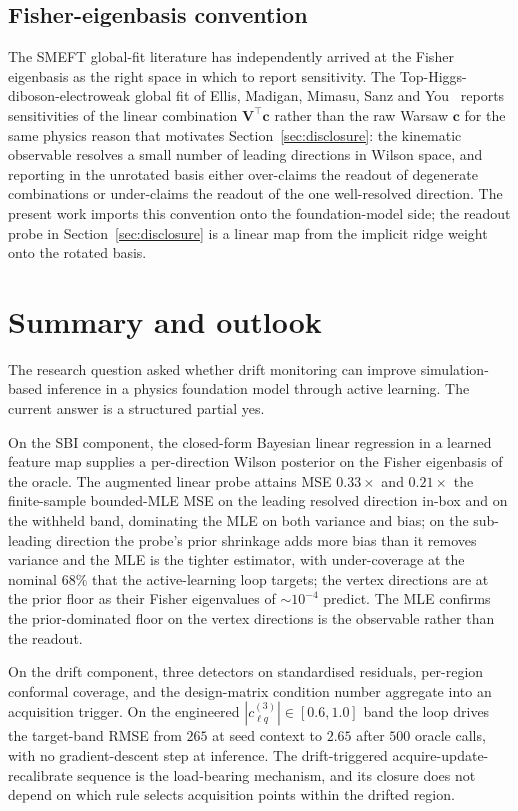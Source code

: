 \documentclass[11pt,a4paper]{article}
\begin{document}
\subsection{Fisher-eigenbasis convention}

The SMEFT global-fit literature has independently arrived at the Fisher eigenbasis as the right space in which to report sensitivity. The Top-Higgs-diboson-electroweak global fit of Ellis, Madigan, Mimasu, Sanz and You~\cite{Ellis:2020smeft} reports sensitivities of the linear combination $\bm{V}^\top \bm{c}$ rather than the raw Warsaw $\bm{c}$ for the same physics reason that motivates Section~\ref{sec:disclosure}: the kinematic observable resolves a small number of leading directions in Wilson space, and reporting in the unrotated basis either over-claims the readout of degenerate combinations or under-claims the readout of the one well-resolved direction. The present work imports this convention onto the foundation-model side; the readout probe in Section~\ref{sec:disclosure} is a linear map from the implicit ridge weight onto the rotated basis.

\section{Summary and outlook}
\label{sec:conclusions}

The research question asked whether drift monitoring can improve simulation-based inference in a physics foundation model through active learning. The current answer is a structured partial yes.

On the SBI component, the closed-form Bayesian linear regression in a learned feature map supplies a per-direction Wilson posterior on the Fisher eigenbasis of the oracle. The augmented linear probe attains MSE $0.33\times$ and $0.21\times$ the finite-sample bounded-MLE MSE on the leading resolved direction in-box and on the withheld band, dominating the MLE on both variance and bias; on the sub-leading direction the probe's prior shrinkage adds more bias than it removes variance and the MLE is the tighter estimator, with under-coverage at the nominal $68\%$ that the active-learning loop targets; the vertex directions are at the prior floor as their Fisher eigenvalues of $\sim 10^{-4}$ predict. The MLE confirms the prior-dominated floor on the vertex directions is the observable rather than the readout.

On the drift component, three detectors on standardised residuals, per-region conformal coverage, and the design-matrix condition number aggregate into an acquisition trigger. On the engineered $|c_{\ell q}^{(3)}| \in [0.6, 1.0]$ band the loop drives the target-band RMSE from $265$ at seed context to $2.65$ after $500$ oracle calls, with no gradient-descent step at inference. The drift-triggered acquire-update-recalibrate sequence is the load-bearing mechanism, and its closure does not depend on which rule selects acquisition points within the drifted region.
\end{document}
